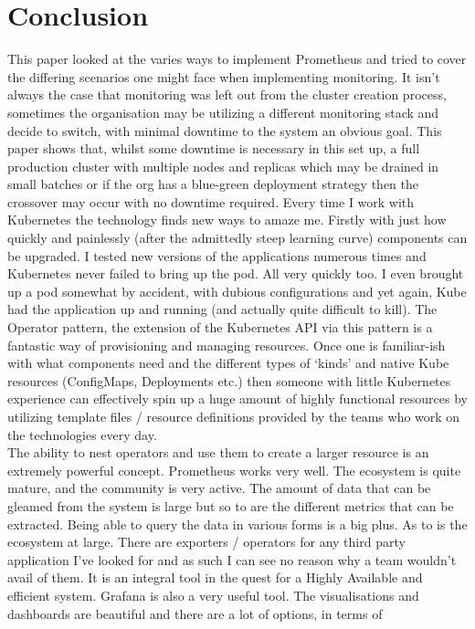 \section{Conclusion}
This paper looked at the varies ways to implement Prometheus and tried to cover the differing scenarios one might face when implementing
monitoring. It isn't always the case that monitoring was left out from the cluster creation process, sometimes the organisation may
be utilizing a different monitoring stack and decide to switch, with minimal downtime to the system an obvious goal. This paper
shows that, whilst some downtime is necessary in this set up, a full production cluster with multiple nodes and replicas which may be drained
in small batches or if the org has a blue-green deployment strategy then the crossover may occur with no downtime required.
\bigbreak
Every time I work with Kubernetes the technology finds new ways to amaze me. Firstly with just how quickly and painlessly (after
the admittedly steep learning curve) components can be upgraded. I tested new versions of the applications numerous times and
Kubernetes never failed to bring up the pod. All very quickly too. I even brought up a pod somewhat by accident, with dubious configurations
and yet again, Kube had the application up and running (and actually quite difficult to kill).
\bigbreak
The Operator pattern, the extension of the Kubernetes API via this pattern is a fantastic way of provisioning and managing
resources. Once one is familiar-ish with what components need and the different types of `kinds' and native Kube resources
(ConfigMaps, Deployments etc.) then someone with little Kubernetes experience can effectively spin up a huge amount of highly functional
resources by utilizing template files / resource definitions provided by the teams who work on the technologies every day.\\
The ability to nest operators and use them to create a larger resource is an extremely powerful concept.
\bigbreak
Prometheus works very well. The ecosystem is quite mature, and the community is very active. The amount of data that can be gleamed from 
the system is large but so to are the different metrics that can be extracted. Being able to query the data in various forms is a big plus.
As to is the ecosystem at large. There are exporters / operators for any third party application I've looked for and as such 
I can see no reason why a team wouldn't avail of them. It is an integral tool in the quest for a Highly Available and efficient system.
\bigbreak
Grafana is also a very useful tool. The visualisations and dashboards are beautiful and there are a lot of options, in terms of 
